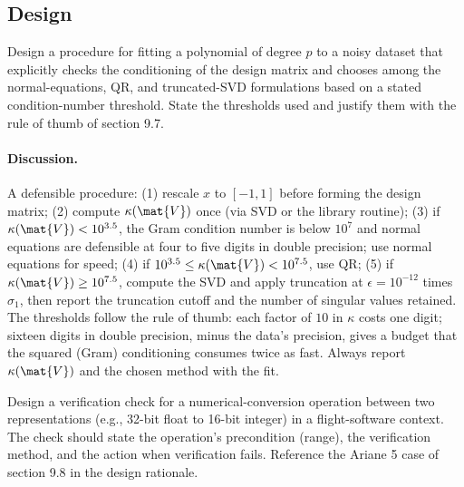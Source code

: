 \subsection*{Design}

\begin{exercise}
Design a procedure for fitting a polynomial of degree $p$ to a
noisy dataset that explicitly checks the conditioning of the
design matrix and chooses among the normal-equations, QR, and
truncated-SVD formulations based on a stated condition-number
threshold. State the thresholds used and justify them with the
rule of thumb of section 9.7.
\end{exercise}

\paragraph{Discussion.}
A defensible procedure: (1) rescale $x$ to $[-1, 1]$ before forming
the design matrix; (2) compute $\kappa(\mat{V})$ once (via SVD or
the library routine); (3) if $\kappa(\mat{V}) < 10^{3.5}$, the
Gram condition number is below $10^{7}$ and normal equations are
defensible at four to five digits in double precision; use
normal equations for speed; (4) if $10^{3.5} \leq \kappa(\mat{V})
< 10^{7.5}$, use QR; (5) if $\kappa(\mat{V}) \geq 10^{7.5}$,
compute the SVD and apply truncation at $\epsilon = 10^{-12}$
times $\sigma_{1}$, then report the truncation cutoff and the
number of singular values retained. The thresholds follow the
rule of thumb: each factor of $10$ in $\kappa$ costs one digit;
sixteen digits in double precision, minus the data's precision,
gives a budget that the squared (Gram) conditioning consumes
twice as fast. Always report $\kappa(\mat{V})$ and the chosen
method with the fit.

\begin{exercise}
Design a verification check for a numerical-conversion operation
between two representations (e.g., 32-bit float to 16-bit integer)
in a flight-software context. The check should state the
operation's precondition (range), the verification method, and
the action when verification fails. Reference the Ariane 5 case
of section 9.8 in the design rationale.
\end{exercise}

